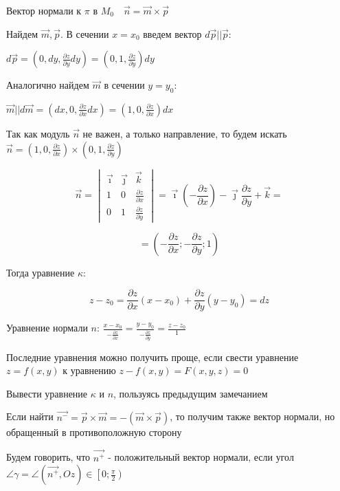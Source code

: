 \documentclass[12pt]{article}
\begin{document}
    Вектор нормали к $\pi$ в $M_0 \quad \vec{n} = \vec{m} \times \vec{p}$

    Найдем $\vec{m}, \vec{p}$. В сечении $x = x_0$ введем вектор $d\vec{p} || \vec{p}$:

    $d\vec{p} = \left(0, dy, \frac{\partial z}{\partial y}dy\right) = \left(0, 1, \frac{\partial z}{\partial y}\right) dy$

    Аналогично найдем $\vec{m}$ в сечении $y = y_0$:

    $\vec{m} || d\vec{m} = \left(dx, 0, \frac{\partial z}{\partial x}dx\right) = \left(1, 0, \frac{\partial z}{\partial x}\right) dx$

    Так как модуль $\vec{n}$ не важен, а только направление, то будем искать
    $\vec{n} = \left(1, 0, \frac{\partial z}{\partial x}\right) \times \left(0, 1, \frac{\partial z}{\partial y}\right)$

    \[\vec{n} =
    \begin{vmatrix} \vec\imath & \vec\jmath & \vec k \\
        1 & 0 & \frac{\partial z}{\partial x} \\ 0 & 1 & \frac{\partial z}{\partial y}
    \end{vmatrix} = \vec\imath \left(-\frac{\partial z}{\partial x}\right) - \vec\jmath \frac{\partial z}{\partial y} + \vec k = \]

    \[= \left(-\frac{\partial z}{\partial x}; -\frac{\partial z}{\partial y}; 1\right)\]

    Тогда уравнение $\kappa$:

    \[z - z_0 = \frac{\partial z}{\partial x}(x - x_0) + \frac{\partial z}{\partial y} (y - y_0) = dz\]

    Уравнение нормали $n$: $\frac{x - x_0}{-\frac{\partial z}{\partial x}} = \frac{y - y_0}{-\frac{\partial z}{\partial y}} = \frac{z - z_0}{1}$

    \Nota Последние уравнения можно получить проще, если свести уравнение $z = f(x, y)$ к уравнению $z - f(x, y) = F(x, y, z) = 0$

    \Lab Вывести уравнение $\kappa$ и $n$, пользуясь предыдущим замечанием

    \Nota Если найти $\vec{n^-} = \vec{p} \times \vec{m} = - (\vec{m} \times \vec{p})$, то получим также вектор нормали, но обращенный в противоположную сторону

    Будем говорить, что $\vec{n^+}$ - положительный вектор нормали, если угол $\angle\gamma = \angle (\vec{n^+}, Oz) \in \left[0; \frac{\pi}{2}\right)$
\end{document}
